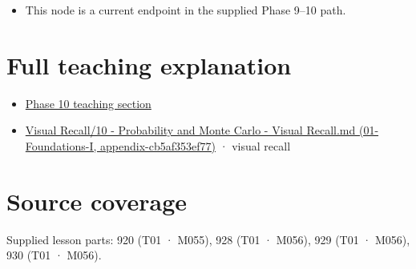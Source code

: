 \begin{itemize}
\tightlist
\item
  This node is a current endpoint in the supplied Phase 9--10 path.
\end{itemize}

\section{Full teaching explanation}\label{appendix-f0437ea55a47-full-teaching-explanation}

\begin{itemize}
\tightlist
\item
  \href{Continuous\%20Notes/Computing\%20Foundations\%20-\%20From\%20Bits\%20to\%20C++\%20and\%20Systems\%20APIs\#5.\%20Waiting\%20times,\%20event\%20counts,\%20and\%20covariance\%20geometry}{Phase 10 teaching section}
\item
  \href{../01-Foundations-I/main.pdf\#nameddest=appendix-cb5af353ef77}{Visual Recall/10 - Probability and Monte Carlo - Visual Recall.md (01-Foundations-I, appendix-cb5af353ef77)} · visual recall
\end{itemize}

\section{Source coverage}\label{appendix-f0437ea55a47-source-coverage}

Supplied lesson parts: 920 (T01 · M055), 928 (T01 · M056), 929 (T01 · M056), 930 (T01 · M056).
